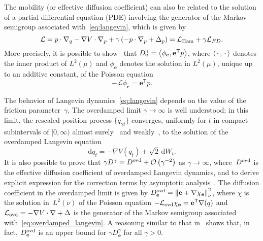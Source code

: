 \documentclass[11pt,a4paper]{article}
\newcommand{\laplacian}{\Delta}
\newcommand{\dummy}{\,\cdot\,}
\newcommand{\grad}{\nabla}
\newcommand{\vect}[1]{\boldsymbol{\mathbf #1}}
\renewcommand{\d}{\mathrm d}
\renewcommand{\t}{\mathsf T}
\theoremstyle{plain}
\numberwithin{equation}{section}
\begin{document}
The mobility (or effective diffusion coefficient)
can also be related to the solution of a partial differential equation (PDE) involving the generator of the Markov semigroup associated with~\eqref{eq:langevin},
which is given by
\begin{equation}
    \label{eq:decomposition_generator}
    \mathcal L
    = p \cdot \grad_q - \grad V \cdot \grad_p + \gamma \left( - p \cdot \grad_p + \laplacian_p \right)
    = \mathcal L_{\rm Ham} + \gamma \mathcal L_{FD}.
\end{equation}
More precisely, it is possible to  show~\cite{pavliotis2008multiscale,MR3509213} that $D^{\gamma}_{\vect e} = \ip{\phi_{\vect e}}{\vect e^\t p}$,
where $\ip{\dummy}{\dummy}$ denotes the inner product of $L^2(\mu)$ and $\phi_{\vect e}$ denotes the solution in $L^2(\mu)$,
unique up to an additive constant,
of the Poisson equation
\begin{equation}
    \label{eq:poisson_equation}
    - \mathcal L \phi_{\vect e} = \vect e^\t p.
\end{equation}

The behavior of Langevin dynamics~\eqref{eq:langevin} depends on the value of the friction parameter~$\gamma$,
The overdamped limit $\gamma \to \infty$ is well understood;
in this limit, the rescaled position process $\{q_{\gamma t}\}$
converges, uniformly for $t$ in compact subintervals of $[0, \infty)$ almost surely~\cite{MR0214150} and weakly~\cite{MR4054345},
to the solution of the overdamped Langevin equation
\begin{equation}
    \label{eq:overdamped_langevin}
    \d q_t = - \grad V(q_t) + \sqrt{2} \, \d W_t.
\end{equation}
It is also possible to prove that $\gamma D^{\gamma} = D^{\rm ovd} + \bigo{\gamma^{-2}}$ as $\gamma \to \infty$,
where~$D^{\rm ovd}$ is the effective diffusion coefficient of overdamped Langevin dynamics,
and to derive explicit expression for the correction terms by asymptotic analysis~\cite{MR2394704}.
The diffusion coefficient in the overdamped limit is given by $D^{\rm ovd}_{\vect e} = \norm{\vect e + \grad \chi_{\vect e}}[\nu]^2$,
where $\chi$ is the solution in~$L^2(\nu)$ of the Poisson equation $- \mathcal L_{\rm ovd} \chi_{\vect e} = \vect e^\t \grad(q)$
and $\mathcal L_{\rm ovd} = - \grad V \cdot \grad + \laplacian$ is the generator of the Markov semigroup associated with~\eqref{eq:overdamped_langevin}.
A reasoning similar to that in~\cite[Proposition 4.1]{MR2394704} shows that,
in fact, $D^{\rm ovd}_{\vect e}$ is an upper bound for $\gamma D^{\gamma}_{\vect e}$ for all $\gamma > 0$.
\end{document}
